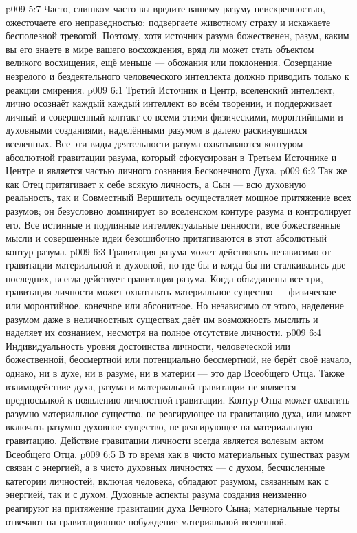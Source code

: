 \vs p009 5:7 Часто, слишком часто вы вредите вашему разуму неискренностью, ожесточаете его неправедностью; подвергаете животному страху и искажаете бесполезной тревогой. Поэтому, хотя источник разума божественен, разум, каким вы его знаете в мире вашего восхождения, вряд ли может стать объектом великого восхищения, ещё меньше --- обожания или поклонения. Созерцание незрелого и бездеятельного человеческого интеллекта должно приводить только к реакции смирения.
\vs p009 6:1 Третий Источник и Центр, вселенский интеллект, лично осознаёт каждый  каждый интеллект во всём творении, и поддерживает личный и совершенный контакт со всеми этими физическими, моронтийными и духовными созданиями, наделёнными разумом в далеко раскинувшихся вселенных. Все эти виды деятельности разума охватываются контуром абсолютной гравитации разума, который сфокусирован в Третьем Источнике и Центре и является частью личного сознания Бесконечного Духа.
\vs p009 6:2 Так же как Отец притягивает к себе всякую личность, а Сын --- всю духовную реальность, так и Совместный Вершитель осуществляет мощное притяжение всех разумов; он безусловно доминирует во вселенском контуре разума и контролирует его. Все истинные и подлинные интеллектуальные ценности, все божественные мысли и совершенные идеи безошибочно притягиваются в этот абсолютный контур разума.
\vs p009 6:3 \pc Гравитация разума может действовать независимо от гравитации материальной и духовной, но где бы и когда бы ни сталкивались две последних, всегда действует гравитация разума. Когда объединены все три, гравитация личности может охватывать материальное существо --- физическое или моронтийное, конечное или абсонитное. Но независимо от этого, наделение разумом даже в неличностных существах даёт им возможность мыслить и наделяет их сознанием, несмотря на полное отсутствие личности.
\vs p009 6:4 \pc Индивидуальность уровня достоинства личности, человеческой или божественной, бессмертной или потенциально бессмертной, не берёт своё начало, однако, ни в духе, ни в разуме, ни в материи --- это дар Всеобщего Отца. Также взаимодействие духа, разума и материальной гравитации не является предпосылкой к появлению личностной гравитации. Контур Отца может охватить разумно\hyp{}материальное существо, не реагирующее на гравитацию духа, или может включать разумно\hyp{}духовное существо, не реагирующее на материальную гравитацию. Действие гравитации личности всегда является волевым актом Всеобщего Отца.
\vs p009 6:5 В то время как в чисто материальных существах разум связан с энергией, а в чисто духовных личностях --- с духом, бесчисленные категории личностей, включая человека, обладают разумом, связанным как с энергией, так и с духом. Духовные аспекты разума создания неизменно реагируют на притяжение гравитации духа Вечного Сына; материальные черты отвечают на гравитационное побуждение материальной вселенной.
